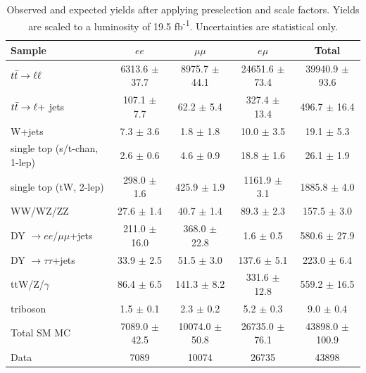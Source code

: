 \begin{table}[htb]
\begin{center}
\caption{Observed and expected yields after applying preselection and scale
  factors. Yields are scaled to a luminosity of 19.5
  fb\textsuperscript{-1}. Uncertainties are statistical only.}
\label{tab:afb:datamcyields}
\begin{tabular}{l |  c  c  c  c}
\hline
                                        Sample   &                $ee$   &            $\mu\mu$   &              $e\mu$   &               Total  \\
\hline
                 $t\bar{t} \rightarrow \ell\ell$   &   6313.6 $\pm$ 37.7   &   8975.7 $\pm$ 44.1   &  24651.6 $\pm$ 73.4   &  39940.9 $\pm$ 93.6  \\
              $t\bar{t} \rightarrow \ell +$ jets   &     107.1 $\pm$ 7.7   &      62.2 $\pm$ 5.4   &    327.4 $\pm$ 13.4   &    496.7 $\pm$ 16.4  \\
                                        W+jets   &       7.3 $\pm$ 3.6   &       1.8 $\pm$ 1.8   &      10.0 $\pm$ 3.5   &      19.1 $\pm$ 5.3  \\
                  single top (s/t-chan, 1-lep)   &       2.6 $\pm$ 0.6   &       4.6 $\pm$ 0.9   &      18.8 $\pm$ 1.6   &      26.1 $\pm$ 1.9  \\
                        single top (tW, 2-lep)   &     298.0 $\pm$ 1.6   &     425.9 $\pm$ 1.9   &    1161.9 $\pm$ 3.1   &    1885.8 $\pm$ 4.0  \\
                                      WW/WZ/ZZ   &      27.6 $\pm$ 1.4   &      40.7 $\pm$ 1.4   &      89.3 $\pm$ 2.3   &     157.5 $\pm$ 3.0  \\
               DY $\rightarrow ee/\mu\mu$+jets   &    211.0 $\pm$ 16.0   &    368.0 $\pm$ 22.8   &       1.6 $\pm$ 0.5   &    580.6 $\pm$ 27.9  \\
                DY $\rightarrow \tau\tau$+jets   &      33.9 $\pm$ 2.5   &      51.5 $\pm$ 3.0   &     137.6 $\pm$ 5.1   &     223.0 $\pm$ 6.4  \\
                                ttW/Z/$\gamma$   &      86.4 $\pm$ 6.5   &     141.3 $\pm$ 8.2   &    331.6 $\pm$ 12.8   &    559.2 $\pm$ 16.5  \\
                                      triboson   &       1.5 $\pm$ 0.1   &       2.3 $\pm$ 0.2   &       5.2 $\pm$ 0.3   &       9.0 $\pm$ 0.4  \\
\hline
                                   Total SM MC   &   7089.0 $\pm$ 42.5   &  10074.0 $\pm$ 50.8   &  26735.0 $\pm$ 76.1   & 43898.0 $\pm$ 100.9  \\
\hline
                                          Data   &                7089   &               10074   &               26735   &               43898  \\
\hline

\end{tabular}
\end{center}
\end{table}

